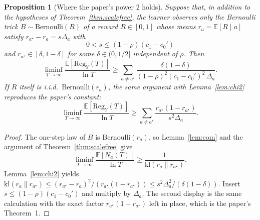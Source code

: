 \documentclass{article}
\newtheorem{proposition}[theorem]{Proposition}
\theoremstyle{definition}
\theoremstyle{remark}
\newcommand{\E}{\mathbb{E}}
\newcommand{\kl}{\mathrm{kl}}
\newcommand{\Reg}{\mathrm{Reg}}
\begin{document}
\begin{proposition}[Where the paper's power $2$ holds]\label{prop:square}
Suppose that, in addition to the hypotheses of Theorem~\ref{thm:scalefree}, the learner observes only the Bernoulli trick $B\sim\mathrm{Bernoulli}(R)$ of a reward $R\in[0,1]$ whose means $r_a=\E[R\mid a]$ satisfy $r_{a^\star}-r_a=s\Delta_a$ with
\[
0<s\le(1-\rho)(c_1-c_0')
\]
and $r_{a^\star}\in[\delta,1-\delta]$ for some $\delta\in(0,1/2]$ independent of $\rho$. Then
\begin{equation}\label{eq:square}
\liminf_{T\to\infty}\frac{\E[\Reg_Y(T)]}{\ln T}
\ge\sum_{a\neq a^\star}
\frac{\delta(1-\delta)}{(1-\rho)^2(c_1-c_0')^2\,\Delta_a}.
\end{equation}
If $R$ itself is i.i.d.\ $\mathrm{Bernoulli}(r_a)$, the same argument with Lemma~\ref{lem:chi2} reproduces the paper's constant:
\[
\liminf_{T\to\infty}\frac{\E[\Reg_Y(T)]}{\ln T}
\ge\sum_{a\neq a^\star}\frac{r_{a^\star}(1-r_{a^\star})}{s^2\Delta_a}.
\]
\end{proposition}

\begin{proof}
The one-step law of $B$ is $\mathrm{Bernoulli}(r_a)$, so Lemma~\ref{lem:com} and the argument of Theorem~\ref{thm:scalefree} give
\[
\liminf_{T\to\infty}\frac{\E[N_a(T)]}{\ln T}\ge\frac{1}{\kl(r_a\|r_{a^\star})}.
\]
Lemma~\ref{lem:chi2} yields $\kl(r_a\|r_{a^\star})\le(r_{a^\star}-r_a)^2/(r_{a^\star}(1-r_{a^\star}))\le s^2\Delta_a^2/(\delta(1-\delta))$. Insert $s\le(1-\rho)(c_1-c_0')$ and multiply by $\Delta_a$. The second display is the same calculation with the exact factor $r_{a^\star}(1-r_{a^\star})$ left in place, which is the paper's Theorem~1.
\end{proof}
\end{document}
